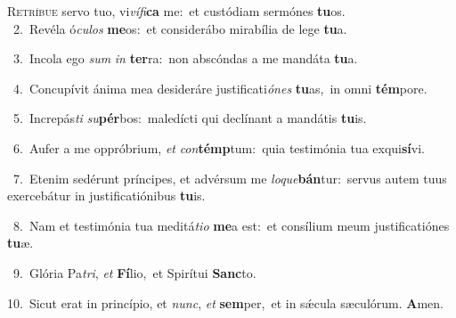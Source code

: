 \lettrine{\initial\textcolor{\initialcolor}{R}}{etríbue} servo tuo, vi\-\textit{ví}\-\textit{fi}\textbf{ca} me:~\star et custódiam sermónes \textbf{tu}\-os.\\
{\numbfont\textcolor{\numbcolor}{~2.}}~Revéla ó\-\textit{cu}\-\textit{los} \textbf{me}\-os:~\star et considerábo mirabília de lege \textbf{tu}\-a.\par
{\numbfont\textcolor{\numbcolor}{~3.}}~Incola ego \textit{sum} \textit{in} \textbf{ter}\-ra:~\star non abscóndas a me mandáta \textbf{tu}\-a.\par
{\numbfont\textcolor{\numbcolor}{~4.}}~Concupívit ánima mea desideráre justificati\-\textit{ó}\-\textit{nes} \textbf{tu}\-as,~\star in omni \textbf{tém}\-pore.\par
{\numbfont\textcolor{\numbcolor}{~5.}}~Increpás\textit{ti} \textit{su}\-\textbf{pér}bos:~\star maledícti qui declínant a mandátis \textbf{tu}\-is.\par
{\numbfont\textcolor{\numbcolor}{~6.}}~Aufer a me oppróbrium, \textit{et} \textit{con}\-\textbf{témp}tum:~\star quia testimónia tua exqui\-\textbf{sí}\-vi.\par
{\numbfont\textcolor{\numbcolor}{~7.}}~Etenim sedérunt príncipes, et advérsum me \textit{lo}\-\textit{que}\textbf{bán}tur:~\star servus autem tuus exercebátur in justificatiónibus \textbf{tu}\-is.\par
{\numbfont\textcolor{\numbcolor}{~8.}}~Nam et testimónia tua meditá\-\textit{ti}\-\textit{o} \textbf{me}\-a est:~\star et consílium meum justificatiónes \textbf{tu}\-æ.\par
{\numbfont\textcolor{\numbcolor}{~9.}}~Glória Pa\-\textit{tri}\-, \textit{et} \textbf{Fí}\-lio,~\star et Spirítui \textbf{Sanc}\-to.\par
{\numbfont\textcolor{\numbcolor}{10.}}~Sicut erat in princípio, et \textit{nunc}\-, \textit{et} \textbf{sem}\-per,~\star et in sǽcula sæculórum. \textbf{A}\-men.\par
